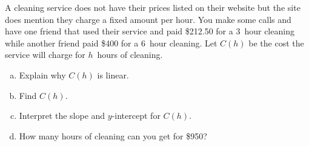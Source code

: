 \documentclass[12pt,letterpaper]{exam}
\begin{document}
\begin{questions}
\newpage
\question[10] A cleaning service does not have their prices listed on their website but the site does mention they charge a fixed amount per hour. You make some calls and have one friend that used their service and paid \$212.50 for a 3~hour cleaning while another friend paid \$400 for a 6~hour cleaning. Let $C(h)$ be the cost the service will charge for $h$~hours of cleaning.
	\begin{enumerate}[(a)]
	\item Explain why $C(h)$ is linear.
	\item Find $C(h)$.
	\item Interpret the slope and $y$-intercept for $C(h)$.
	\item How many hours of cleaning can you get for \$950?
	\end{enumerate}


\end{questions}
\end{document}

